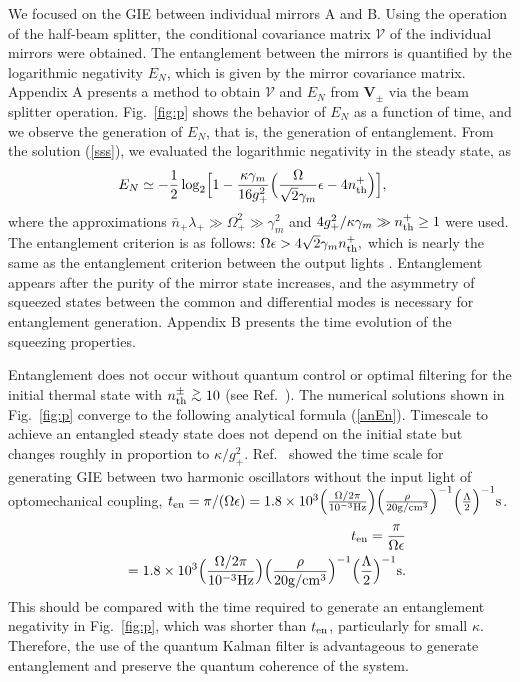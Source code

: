 \documentclass[twocolumn,superscriptaddress,aps,preprintnumbers,amsmath,amssymb,prl,nofootinbib]{revtex4}
\newcommand{\simgt}{\lower.5ex\hbox{$\; \buildrel > \over \sim \;$}}
\begin{document}
We focused on the GIE between individual mirrors A and B. 
Using the operation of the half-beam splitter, the conditional covariance matrix 
$\bm{\mathcal{V}}$ of the individual mirrors were obtained. 
The entanglement between the mirrors is quantified by the logarithmic negativity 
$E_N$, which is given by the mirror covariance matrix. 
Appendix A presents a method to obtain 
$\bm{\mathcal{V}}$ and 
$E_N$ from 
$\bm{V}_\pm$ via the beam splitter operation.
Fig.~\ref{fig:p} shows the behavior of $E_N$ as a function of time, and we observe the generation of 
$E_N$, that is, the generation of entanglement.    
From the solution (\ref{sss}), we evaluated the logarithmic 
negativity in the steady state, as
\begin{eqnarray}
E_N&\simeq
       \displaystyle{ -\frac{1}{2}\log_2
    \Bigl[
    1-\frac{\kappa\gamma_m}{16g_+^2}\Bigl(\frac{\Omega}{\sqrt{2}\gamma_m}\epsilon-4n_{\rm th}^+\Bigr)\Bigr]},
    \label{anEn}
\end{eqnarray}
where the approximations $\bar{n}_+\lambda_+\gg\Omega_+^2\gg\gamma_m^2$ and $4g_+^2/\kappa\gamma_m\gg n_{\rm th}^+\ge1$ were used.
The entanglement criterion is as follows:
$
    \Omega\epsilon>
    4\sqrt{2}\gamma_mn_{\rm th}^+,
$
which is nearly the same as the entanglement criterion between the output lights \cite{Miao20,Datta21}.
Entanglement appears after the purity of the mirror state increases, and the 
asymmetry of squeezed states between the common and differential modes
is necessary for entanglement generation. Appendix B presents the time evolution of the squeezing properties. 


Entanglement does not occur without quantum control or optimal filtering for the initial thermal state with $n_{\rm th}^\pm\simgt10$ 
(see Ref.~\cite{Krisnanda}).
The numerical solutions shown in Fig.~\ref{fig:p} converge to the following analytical formula 
(\ref{anEn}). 
Timescale to achieve an entangled steady state
does not depend on the initial state but changes roughly in proportion to $\kappa/g_+^2$. 
Ref.~\cite{Krisnanda} showed the time scale for generating GIE between two harmonic oscillators without the input light of optomechanical coupling, 
$t_{\rm en}=\pi/(\Omega\epsilon)
\nonumber =1.8\times 10^3 
\Bigl(\frac{\Omega/2\pi}{10^{-3} {\rm Hz}}\Bigr)
    {\Bigl(\frac{\rho}{20{\rm g/cm^3}}\Bigr)}^{-1}
    \Bigl(\frac{\Lambda}{2}\Bigr)^{-1}{\rm s}$. 
\begin{eqnarray}
    \label{tkris}
    &&t_{\rm en}=\frac{\pi}{\Omega\epsilon}
    \nonumber\\
    &&=1.8\times 10^3 
    \Bigl(\frac{\Omega/2\pi}{10^{-3} {\rm Hz}}\Bigr)
    {\Bigl(\frac{\rho}{20{\rm g/cm^3}}\Bigr)}^{-1}
    \Bigl(\frac{\Lambda}{2}\Bigr)^{-1}{\rm s}.
\end{eqnarray}
\fi
This should be compared with the time required to generate an entanglement negativity
in Fig.~\ref{fig:p}, which was shorter than $t_{\rm en}$, particularly for 
small $\kappa$. 
Therefore, the use of the quantum Kalman filter is advantageous
to generate entanglement and preserve the quantum coherence of the system.
\end{document}
